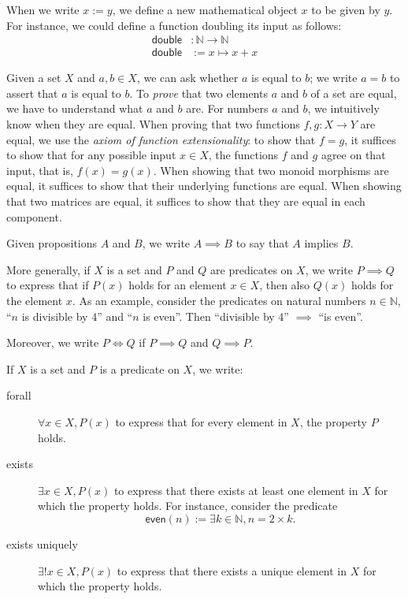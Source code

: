 \documentclass[a4paper,11pt, oneside,titlepage=false]{scrbook}
\theoremstyle{plain}
\theoremstyle{definition}
\newcommand{\NN}{\ensuremath{\mathbb{N}}}
\begin{document}
\begin{description}
\item[Definitions] When we write $x := y$, we define a new mathematical object $x$ to be given by $y$.
  For instance, we could define a function doubling its input as follows:
  \begin{align*}
    \mathsf{double} &: \NN \to \NN
    \\
    \mathsf{double} &:=  x \mapsto x + x
  \end{align*}
  
\item[Equality] Given a set $X$ and $a,b\in X$, we can ask whether $a$ is equal to $b$; we write $a = b$ to assert that $a$ is equal to $b$.
  To \emph{prove} that two elements $a$ and $b$ of a set are equal, we have to understand what $a$ and $b$ are. For numbers $a$ and $b$, we intuitively know when they are equal.
  When proving that two functions $f, g : X \to Y$ are equal, we use the \emph{axiom of function extensionality}: to show that $f = g$, it suffices to show that for any possible input $x \in X$, the functions $f$ and $g$ agree on that input, that is, $f(x) = g(x)$.
  When showing that two monoid morphisms are equal, it suffices to show that their underlying functions are equal.
  When showing that two matrices are equal, it suffices to show that they are equal in each component.
\item [Implication]
  Given propositions $A$ and $B$, we write $A \implies B$ to say that $A$ implies $B$.
  
  More generally, if $X$ is a set and $P$ and $Q$ are predicates on $X$, we write $P\implies Q$ to express that if $P(x)$ holds for an element $x\in X$, then also $Q(x)$  holds for the element $x$.
  As an example, consider the predicates on natural numbers $n \in \NN$, ``$n$ is divisible by $4$'' and ``$n$ is even''.
  Then ``divisible by $4$'' $\implies$ ``is even''.

  Moreover, we write $P \iff Q$ if $P\implies Q$ and $Q\implies P$.
\item If $X$ is a set and $P$ is a predicate on $X$, we write:
\begin{description}
\item[forall] $\forall x\in X, P(x)$ to express that for every element in $X$, the property $P$ holds.
\item[exists] $\exists x\in X, P(x)$ to express that there exists at least one element in $X$ for which the property holds.
  For instance, consider the predicate
  \[  \mathsf{even}(n) := \exists k \in \NN, n = 2\times k.\]
\item[exists uniquely] $\exists! x\in X, P(x)$ to express that there exists a unique element in $X$ for which the property holds.
\end{description}
\end{description}
\end{document}
